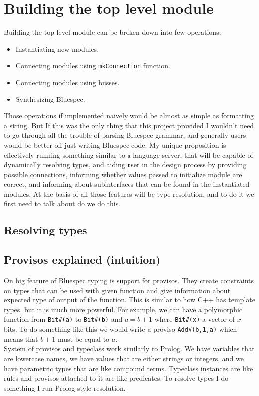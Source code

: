 \documentclass[14pt]{report}
\begin{document}
\section{Building the top level module}
Building the top level module can be broken down into few operations.
\begin{itemize}
    \item Instantiating new modules.
    \item Connecting modules using \verb!mkConnection! function.
    \item Connecting modules using busses.
    \item Synthesizing Bluespec.
\end{itemize} 
Those operations if implemented naively would be almost as simple as formatting a string. But If this was the only thing that this project provided I wouldn't need to go through all the trouble of parsing Bluespec grammar, and generally users would be better off just writing Bluespec code. My unique proposition is effectively running something similar to a language server, that will be capable of dynamically resolving types, and aiding user in the design process by providing possible connections, informing whether values passed to initialize module are correct, and informing about subinterfaces that can be found in the instantiated modules. 
At the basis of all those features will be type resolution, and to do it we first need to talk about do we do this.
\subsection{Resolving types}
\subsection{Provisos explained (intuition)}
On big feature of Bluespec typing is support for provisos. They create constraints on types that can be used with given function and give information about expected type of output of the function. This is similar to how C++ has template types, but it is much more powerful. For example, we can have a polymorphic function from \verb!Bit#(a)! to \verb!Bit#(b)! and $a=b+1$ where \verb!Bit#(x)! a vector of $x$ bits.  To do something like this we would write a proviso \verb!Add#(b,1,a)! which means that $b+1$ must be equal to $a$.
\\
System of provisos and typeclass work similarly to Prolog. We have variables that are lowercase names, we have values that are either strings or integers, and we have parametric types that are like compound terms. Typeclass instances are like rules and provisos attached to it are like predicates. To resolve types I do something I run Prolog style resolution. 
\end{document}

